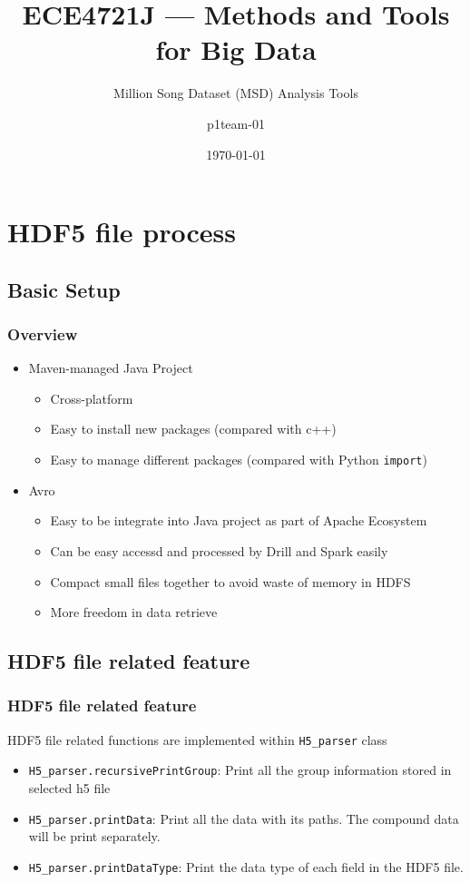 \documentclass{beamer}
\title{ECE4721J --- Methods and Tools for Big Data}
\author{p1team-01}
\date{\today}
\subtitle{Million Song Dataset (MSD) Analysis Tools}
\institute{UM-JI (Summer 2022)}
\begin{document}
\begin{frame}
	\titlepage
\end{frame}

\section{HDF5 file process}
\begin{frame}
\end{frame}

\subsection{Basic Setup}
\begin{frame}
	\frametitle{Overview}
	\begin{itemize}
		\item Maven-managed Java Project
		\begin{itemize}
		\item Cross-platform 
		\item Easy to install new packages (compared with c++) 
		\item Easy to manage different packages (compared with Python \texttt{import})
		\end{itemize}
		\item Avro
		\begin{itemize}
		\item Easy to be integrate into Java project as part of Apache Ecosystem
		\item Can be easy accessd and processed by Drill and Spark easily
		\item Compact small files together to avoid waste of memory in HDFS
		\item More freedom in data retrieve
		\end{itemize}
	
	\end{itemize}	
\end{frame}

\subsection{HDF5 file related feature}
\begin{frame}
	\frametitle{HDF5 file related feature}
	HDF5 file related functions are implemented within \texttt{H5_parser} class
	\begin{itemize}
		\item \texttt{H5_parser.recursivePrintGroup}: Print all the group information stored in selected h5 file
		\item \texttt{H5_parser.printData}: Print all the data with its paths. The compound data will be print separately.
		\item \texttt{H5_parser.printDataType}: Print the data type of each field in the HDF5 file.
	\end{itemize}
	
\end{frame}
\end{document}
